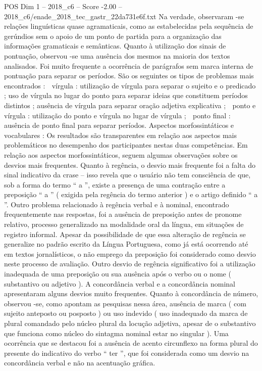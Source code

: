 \begin{textsample}{POS Dim 1 – 2018\_c6 – Score -2.00 – 2018\_c6/enade\_2018\_tec\_gastr\_22da731e6f.txt}
Na verdade, observaram -se relações linguísticas quase agramaticais, como as estabelecidas pela sequência de gerúndios sem o apoio de um ponto de partida para a organização das informações gramaticais e semânticas.
Quanto à utilização dos sinais de pontuação, observou -se uma ausência dos mesmos na maioria dos textos analisados.
Foi muito frequente a ocorrência de parágrafos sem marca interna de pontuação para separar os períodos.
São os seguintes os tipos de problemas mais encontrados :  vírgula : utilização de vírgula para separar o sujeito e o predicado ; uso de vírgula no lugar do ponto para separar ideias que constituem períodos distintos ; ausência de vírgula para separar oração adjetiva explicativa ;  ponto e vírgula : utilização do ponto e vírgula no lugar de vírgula ;  ponto final : ausência de ponto final para separar períodos.
Aspectos morfossintáticos e vocabulares : Os resultados são transparentes em relação aos aspectos mais problemáticos no desempenho dos participantes nestas duas competências.
Em relação aos aspectos morfossintáticos, seguem algumas observações sobre os desvios mais frequentes.
Quanto à regência, o desvio mais frequente foi a falta do sinal indicativo da crase – isso revela que o usuário não tem consciência de que, sob a forma do termo “ a ”, existe a presença de uma contração entre a preposição “ a ” ( exigida pela regência do termo anterior ) e o artigo definido “ a ”.
Outro problema relacionado à regência verbal e à nominal, encontrado frequentemente nas respostas, foi a ausência de preposição antes de pronome relativo, processo generalizado na modalidade oral da língua, em situações de registro informal.
Apesar da possibilidade de que essa alteração de regência se generalize no padrão escrito da Língua Portuguesa, como já está ocorrendo até em textos jornalísticos, o não emprego da preposição foi considerado como desvio neste processo de avaliação.
Outro desvio de regência significativo foi a utilização inadequada de uma preposição ou sua ausência após o verbo ou o nome ( substantivo ou adjetivo ).
A concordância verbal e a concordância nominal apresentaram alguns desvios muito frequentes.
Quanto à concordância de número, observou -se, como apontam as pesquisas nessa área, ausência de marca ( com sujeito anteposto ou posposto ) ou uso indevido ( uso inadequado da marca de plural comandado pelo núcleo plural da locução adjetiva, apesar de o substantivo que funciona como núcleo do sintagma nominal estar no singular ).
Uma ocorrência que se destacou foi a ausência de acento circunflexo na forma plural do presente do indicativo do verbo “ ter ”, que foi considerada como um desvio na concordância verbal e não na acentuação gráfica.

\end{textsample}
